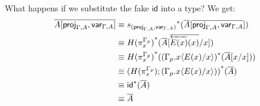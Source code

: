 \documentclass[10pt]{article}
\theoremstyle{definition}
\newcommand{\rewrite}[2]{\overleftarrow{#1}(#2)}
\newcommand\St[2]{\ensuremath{{#1}^*(#2)}}
\newcommand\proj[1]{\ensuremath{\mathsf{proj}_{#1}}}
\newcommand\var[1]{\ensuremath{\mathsf{var}_{#1}}}
\newcommand{\id}{\mathsf{id}}
\newcommand\ap[2]{\ensuremath{#1 \langle #2 \rangle }}
\begin{document}
\begin{enumerate}[style = multiline, labelwidth = 80pt]
What happens if we substitute the fake $\id$ into a type? We get:
\begin{align*}
\upstairs{A[\proj{\Gamma,A}, \var{\Gamma,A}]}
&\equiv \St{s_{(\proj{\Gamma,A}, \var{\Gamma,A})}}{\upstairs{A}[ \upstairs{\proj{\Gamma,A}, \var{\Gamma,A}}]} \\
&\equiv \St{H(\pi^{\asdep{\Gamma}}_x)}{\upstairs{A}[ \upstairs{\rewrite{E(x)}{x}} / x]} \\
&\equiv \St{H(\pi^{\asdep{\Gamma}}_x)}{\St{(\ap{\asdep{\Gamma}.x}{E(x)/x})}{\upstairs{A}[ x / x]}}\\
&\equiv \St{(H(\pi^{\asdep{\Gamma}}_x);(\ap{\asdep{\Gamma}.x}{E(x)/x}))}{\upstairs{A}} \\
&\equiv \St{\id}{\upstairs{A}} \\
&\equiv \upstairs{A}
\end{align*}
\end{enumerate}
\end{document}
